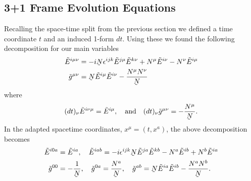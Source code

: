 \documentclass[10pt]{report}
\newcommand{\utilde}[1]{\underaccent{\tilde}{#1}}
\theoremstyle{definition}
\newcommand{\tE}[0]{\tilde{E}}
\newcommand{\tg}[0]{\tilde{g}}
\newcommand{\dlap}[0]{\utilde{N}}
\begin{document}
    \subsection{3+1 Frame Evolution Equations}
    Recalling the space-time split from the previous section we defined a time coordinate $t$ and an induced 1-form $dt$. Using these we found the following decomposition for our main variables 
    \begin{align}
        \tE^{i\mu\nu} & = -i\dlap \epsilon^{ijk} \tE^{j\mu} \tE^{k\nu} + N^\mu \tE^{i\nu} - N^\nu \tE^{i\mu} \\
        \tg^{\mu\nu} & = \dlap \tE^{i\mu} \tE^{i\nu} - \frac{N^\mu N^\nu}{\dlap}
    \end{align}
    where
    \begin{align}
        (dt)_\nu \tE^{i\nu\mu} = \tE^{i\mu}, \quad \textrm{and} \quad (dt)_\nu \tg^{\mu\nu} = -\frac{N^\mu}{\dlap}.
    \end{align}
    In the adapted spacetime coordinates, $x^\mu = (t,x^a)$, the above decomposition becomes
    \begin{align}
        \tE^{i0a} &= \tE^{ia}, \quad \tE^{iab} = -i \epsilon^{ijk} \dlap \tE^{ja} \tE^{kb} - N^a \tE^{ib} + N^b \tE^{ia} \\
        \tg^{00} &= -\frac{1}{\dlap}, \quad \tg^{0a} = \frac{N^a}{\dlap}, \quad \tg^{ab} = \dlap \tE^{ia} \tE^{ib} - \frac{N^a N^b}{\dlap}.
    \end{align}
\end{document}
